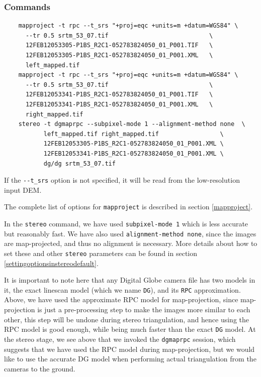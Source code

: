 \subsubsection*{Commands}

\begin{verbatim}
    mapproject -t rpc --t_srs "+proj=eqc +units=m +datum=WGS84" \
      --tr 0.5 srtm_53_07.tif                            \
      12FEB12053305-P1BS_R2C1-052783824050_01_P001.TIF   \
      12FEB12053305-P1BS_R2C1-052783824050_01_P001.XML   \
      left_mapped.tif
    mapproject -t rpc --t_srs "+proj=eqc +units=m +datum=WGS84" \
      --tr 0.5 srtm_53_07.tif                            \
      12FEB12053341-P1BS_R2C1-052783824050_01_P001.TIF   \
      12FEB12053341-P1BS_R2C1-052783824050_01_P001.XML   \
      right_mapped.tif
    stereo -t dgmaprpc --subpixel-mode 1 --alignment-method none  \
           left_mapped.tif right_mapped.tif                 \
           12FEB12053305-P1BS_R2C1-052783824050_01_P001.XML \
           12FEB12053341-P1BS_R2C1-052783824050_01_P001.XML \
           dg/dg srtm_53_07.tif
\end{verbatim}

If the \texttt{-\/-t\_srs} option is not specified, it will be read from
the low-resolution input DEM.

The complete list of options for \texttt{mapproject} is described in
section \ref{mapproject}.

In the \texttt{stereo} command, we have used \texttt{subpixel-mode 1}
which is less accurate but reasonably fast. We have also used
\texttt{alignment-method none}, since the images are map-projected, and
thus no alignment is necessary. More details about how to set these and
other \texttt{stereo} parameters can be found in section
\ref{settingoptionsinstereodefault}.

It is important to note here that any Digital Globe camera file has two
models in it, the exact linescan model (which we name \texttt{DG}), and
its \texttt{RPC} approximation. Above, we have used the approximate RPC
model for map-projection, since map-projection is just a pre-processing
step to make the images more similar to each other, this step will be
undone during stereo triangulation, and hence using the RPC model is
good enough, while being much faster than the exact \texttt{DG}
model. At the stereo stage, we see above that we invoked the
\texttt{dgmaprpc} session, which suggests that we have used the RPC
model during map-projection, but we would like to use the accurate DG
model when performing actual triangulation from the cameras to the
ground.

